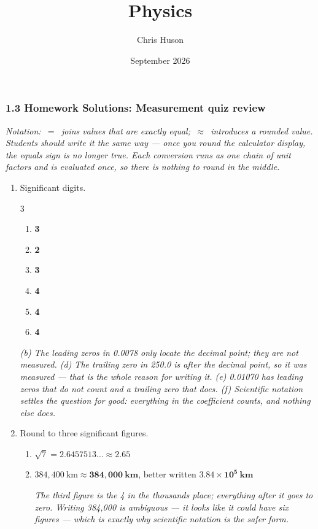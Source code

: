 \documentclass[12pt, twoside]{article}
\title{Physics}
\author{Chris Huson}
\date{September 2026}
\begin{document}
\subsubsection*{1.3 Homework Solutions: Measurement quiz review}

\emph{Notation: \,$=$\, joins values that are exactly equal; \,$\approx$\, introduces a
rounded value. Students should write it the same way --- once you round the calculator
display, the equals sign is no longer true. Each conversion runs as one chain of unit
factors and is evaluated once, so there is nothing to round in the middle.}

\begin{enumerate}[itemsep=0.25cm]

\item Significant digits.
  \begin{multicols}{3}
    \begin{enumerate}[itemsep=0.1cm]
      \item \textbf{3}
      \item \textbf{2}
      \item \textbf{3}
      \item \textbf{4}
      \item \textbf{4}
      \item \textbf{4}
    \end{enumerate}
  \end{multicols}
  \emph{(b) The leading zeros in 0.0078 only locate the decimal point; they are not
  measured. (d) The trailing zero in 250.0 is after the decimal point, so it was
  measured --- that is the whole reason for writing it. (e) 0.01070 has leading zeros
  that do not count and a trailing zero that does. (f) Scientific notation settles the
  question for good: everything in the coefficient counts, and nothing else does.}

\item Round to three significant figures.
  \begin{enumerate}[itemsep=0.15cm]
    \item $\sqrt{7} = 2.6457513\ldots \approx \mathbf{2.65}$
    \item $384{,}400~\text{km} \approx \mathbf{384{,}000~\textbf{km}}$, better written
      $\mathbf{3.84 \times 10^{5}~\textbf{km}}$

      \emph{The third figure is the 4 in the thousands place; everything after it goes to
      zero. Writing 384{,}000 is ambiguous --- it looks like it could have six figures ---
      which is exactly why scientific notation is the safer form.}
  \end{enumerate}


\end{enumerate}
\end{document}
